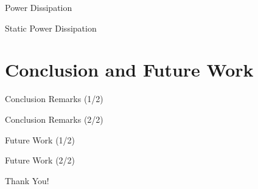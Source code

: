 \documentclass{beamer}
\begin{document}
\begin{CJK}{UTF8}{bkai}
    \begin{frame}{Power Dissipation}
        
    \end{frame}

    \begin{frame}{Static Power Dissipation}
        
    \end{frame}

    \section{Conclusion and Future Work}
    \begin{frame}{Conclusion Remarks (1/2)}
        
    \end{frame}
    \begin{frame}{Conclusion Remarks (2/2)}
        
    \end{frame}
    \begin{frame}{Future Work (1/2)}
        
    \end{frame}

    \begin{frame}{Future Work (2/2)}
        
    \end{frame}

    \begin{frame}[plain,c]
        \centering
        \Huge{Thank You!}
    \end{frame}
\end{CJK}
\end{document}
